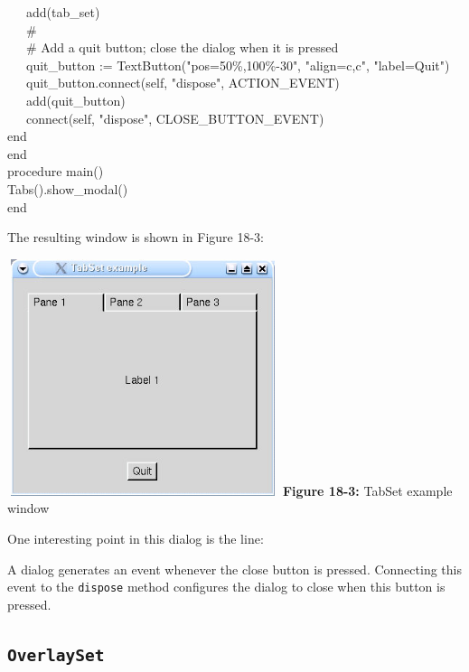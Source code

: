 {\>   \ \ \ add(tab\_set) \\
\>   \ \ \ \# \\
\>   \ \ \ \# Add a quit button; close the dialog when it is pressed \\
\>   \ \ \ quit\_button :=
TextButton("pos=50\%,100\%-30", "align=c,c", "label=Quit") \\
\>   \ \ \ quit\_button.connect(self,
"dispose", ACTION\_EVENT) \\
\>   \ \ \ add(quit\_button) \\
\>   \ \ \ connect(self, "dispose",
CLOSE\_BUTTON\_EVENT) \\
\>   end \\
end \\
procedure main() \\
\>   Tabs().show\_modal() \\
end
}


The resulting window is shown in Figure 18-3:

\begin{center}
\includegraphics[width=3.1272in,height=2.7299in]{ub-img/ub-img52.jpg}
\linebreak
{\sffamily\bfseries Figure 18-3:}
{\sffamily TabSet example window}
\end{center}

\bigskip

\noindent One interesting point in this dialog is the line:



\noindent A dialog generates an event whenever the close button is
pressed. Connecting this event to the \texttt{dispose}
method configures the dialog to close when this button is
pressed.

\subsection*{\texttt{OverlaySet}}

